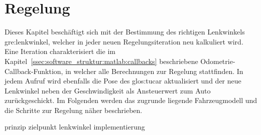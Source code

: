 \chapter{Regelung \dcfirstauthorshort}
\label{cha:regelung}

Dieses Kapitel beschäftigt sich mit der Bestimmung des richtigen Lenkwinkels \gls{gre:lenkwinkel}, welcher in jeder neuen Regelungsiteration neu kalkuliert wird. Eine Iteration charakterisiert die im Kapitel~\ref{ssec:software_struktur:matlab:callbacks} beschriebene Odometrie-Callback-Funktion, in welcher alle Berechnungen zur Regelung stattfinden. In jedem Aufruf wird ebenfalls die Pose des \gls{glos:tucar} aktualisiert und der neue Lenkwinkel neben der Geschwindigkeit als Ansteuerwert zum Auto zurückgeschickt. Im Folgenden werden das zugrunde liegende Fahrzeugmodell und die Schritte zur Regelung näher beschrieben. 

{prinzip}
{zielpunkt}
{lenkwinkel}
{implementierung}

